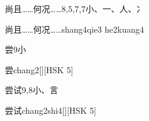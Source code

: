 \begin{Entry}{尚且……何况……}{8,5,7,7}{⼩、⼀、⼈、⼎}
  \begin{Phonetics}{尚且……何况……}{shang4qie3 he2kuang4}
  \end{Phonetics}
\end{Entry}

\begin{Entry}{尝}{9}{⼩}
  \begin{Phonetics}{尝}{chang2}[][HSK 5]
  \end{Phonetics}
\end{Entry}

\begin{Entry}{尝试}{9,8}{⼩、⾔}
  \begin{Phonetics}{尝试}{chang2shi4}[][HSK 5]
  \end{Phonetics}
\end{Entry}


